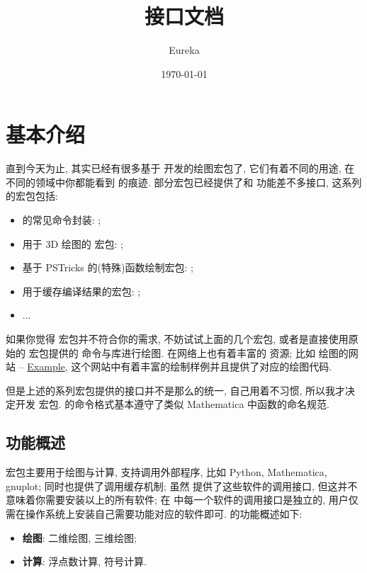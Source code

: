 \documentclass[
  hyper, lang=cn, 
  class=l3dox, 
]{../../zlatex/code/ztex}
\title{\texorpdfstring{\ztikz{} 接口文档}{zTool 接口文档}}
\author{Eureka}
\date{\today}
\begin{document}
  \maketitle
\restoregeometry
  \ztexslideTF{
    \thispagestyle{empty}
    \tableofcontents
  }{
    \thispagestyle{empty}
    \vspace*{-3em}
    \tableofcontents
    \clearpage
  }
\restoregeometry
\fancyheadoffset{0pt}

\section{基本介绍}
直到今天为止, 其实已经有很多基于  开发的绘图宏包了, 它们有着不同的用途, 在不同的领域中你都能看到 \TikZ{} 的痕迹. 
部分宏包已经提供了和  功能差不多接口, 这系列的宏包包括:
\begin{itemize}
  \item  \TikZ{} 的常见命令封装: \href{https://ctan.org/tex-archive/graphics/pgf/contrib/tzplot}{};
  \item 用于 3D 绘图的 \TikZ{} 宏包: \href{https://ctan.org/pkg/tikz-3dplot}{};
  \item 基于 PSTricks 的(特殊)函数绘制宏包: \href{https://ctan.org/pkg/pst-func}{};
  \item 用于缓存编译结果的宏包: \href{https://github.com/leo-colisson/robust-externalize}{};
  \item ...
\end{itemize}


如果你觉得  宏包并不符合你的需求, 不妨试试上面的几个宏包, 或者是直接使用原始的  宏包提供的
命令与库进行绘图. 在网络上也有着丰富的 \TikZ{} 资源; 比如 \TikZ{} 绘图的网站 -- 
\href{https://texample.net/tikz/examples/}{\textcolor{black}{\TikZ} Example}, 这个网站中有着丰富的绘制样例并且提供了对应的绘图代码.


但是上述的系列宏包提供的接口并不是那么的统一, 自己用着不习惯, 所以我才决定开发  宏包. 
\zTikZ{} 的命令格式基本遵守了类似 Mathematica 中函数的命名规范.



\subsection{功能概述}
\zTikZ{} 宏包主要用于绘图与计算, 支持调用外部程序, 比如 Python, Mathematica, gnuplot; 同时也提供了调用缓存机制; 
虽然 \ztikz{} 提供了这些软件的调用接口, 但这并不意味着你需要安装以上的所有软件; 在 \ztikz{} 中每一个软件的调用接口是独立的, 
用户仅需在操作系统上安装自己需要功能对应的软件即可. \zTikZ{} 的功能概述如下: 
\begin{itemize}
  \item \textbf{绘图}: 二维绘图, 三维绘图;
  \item \textbf{计算}: 浮点数计算, 符号计算.
\end{itemize}
\end{document}
